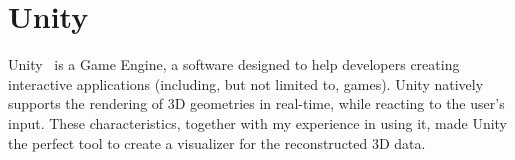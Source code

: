 \section{Unity}

Unity~\cite{unity} is a Game Engine, a software designed to help developers creating interactive applications (including, but not limited to, games).
Unity natively supports the rendering of 3D geometries in real-time, while reacting to the user's input.
These characteristics, together with my experience in using it, made Unity the perfect tool to create a visualizer for the reconstructed 3D data.
